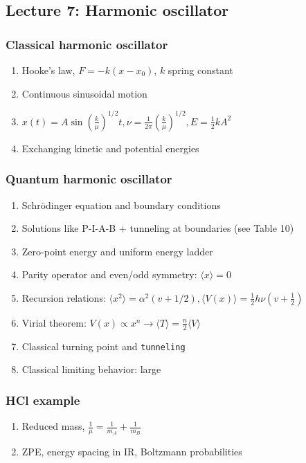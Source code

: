 \documentclass[11pt]{article}
\begin{document}
\subsection{Lecture 7: Harmonic oscillator}
\label{sec:org1c58b5a}
\subsubsection{Classical harmonic oscillator}
\label{sec:orgcd866c1}
\begin{enumerate}
\item Hooke's law, \(F=-k(x-x_0)\), \(k\) spring constant
\item Continuous sinusoidal motion
\item \(x(t)=A \sin(\frac{k}{\mu})^{1/2}t, \nu=\frac{1}{2\pi}(\frac{k}{\mu})^{1/2}, E=\frac{1}{2}kA^2\)
\item Exchanging kinetic and potential energies
\end{enumerate}
\subsubsection{Quantum harmonic oscillator}
\label{sec:org1515fd7}
\begin{enumerate}
\item Schr\"{o}dinger equation and boundary conditions
\item Solutions like P-I-A-B + tunneling at boundaries (see Table 10)
\item Zero-point energy and uniform energy ladder
\item Parity operator and even/odd symmetry:  \(\langle x \rangle =0\)
\item Recursion relations: \(\langle x^2 \rangle =
      \alpha^2 (v+1/2), \langle V(x) \rangle = \frac{1}{2} h\nu (v+\frac{1}{2})\)
\item Virial theorem: \(V(x) \propto x^n \rightarrow \langle T \rangle = \frac{n}{2}\langle V \rangle\)
\item Classical turning point and \texttt{tunneling}
\item Classical limiting behavior: large
\end{enumerate}
\subsubsection{HCl example}
\label{sec:orga0c79a2}
\begin{enumerate}
\item Reduced mass, \(\frac{1}{\mu}=\frac{1}{m_A}+\frac{1}{m_B}\)
\item ZPE, energy spacing in IR, Boltzmann probabilities
\end{enumerate}
\end{document}
